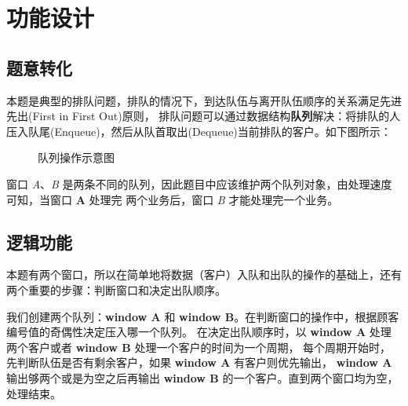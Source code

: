 \chapter{功能设计}

\section{题意转化}
本题是典型的{\kaishu 排队}问题，排队的情况下，到达队伍与离开队伍顺序的关系满足{\kaishu 先进先出(First in First Out)}原则，%
排队问题可以通过数据结构\textbf{队列}解决：将排队的人{\kaishu 压入队尾(Enqueue)}，然后{\kaishu 从队首取出(Dequeue)}当前排队的客户。如下图所示：

\begin{figure}[H]
    \centering
    \caption{队列操作示意图}
\end{figure}

窗口 \textsl{A}、\textsl{B} 是两条不同的队列，因此题目中应该维护两个队列对象，由处理速度可知，当窗口 \textbf{A} 处理完%
两个业务后，窗口 \textsl{B} 才能处理完一个业务。

\vspace*{1cm}

\section{逻辑功能}
本题有两个窗口，所以在简单地将数据（客户）入队和出队的操作的基础上，还有两个重要的步骤：{\kaishu 判断窗口}和{\kaishu 决定出队顺序}。%

我们创建两个队列：\textbf{window A} 和 \textbf{window B}。在判断窗口的操作中，根据顾客编号值的奇偶性决定压入哪一个队列。%
在决定出队顺序时，以 \textbf{window A} 处理两个客户或者 \textbf{window B} 处理一个客户的时间为一个周期，%
每个周期开始时，先判断队伍是否有剩余客户，如果 \textbf{window A} 有客户则优先输出，%
\textbf{window A} 输出够两个或是为空之后再输出 \textbf{window B} 的一个客户。直到两个窗口均为空，处理结束。

